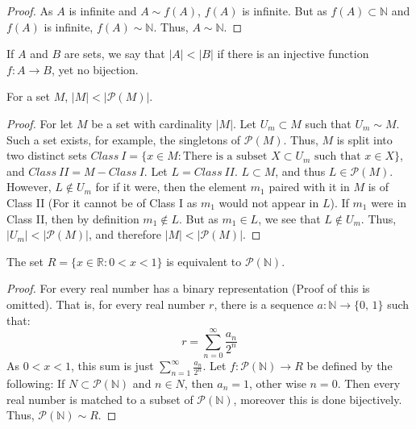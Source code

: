     \begin{proof}
    As $A$ is infinite and $A\sim f(A)$, $f(A)$ is infinite.
    But as $f(A)\subset \mathbb{N}$ and $f(A)$ is infinite,
    $f(A)\sim \mathbb{N}$. Thus, $A\sim \mathbb{N}$.
    \end{proof}
    \begin{definition}
        If $A$ and $B$ are sets, we say that $|A|<|B|$ if there is an
        injective function $f:A\rightarrow B$, yet no bijection.
    \end{definition}
    \begin{theorem}
        For a set $M$, $|M|<|\mathcal{P}(M)|$.
    \end{theorem}
    \begin{proof}
    For let $M$ be a set with cardinality $|M|$. Let $U_m \subset M$ such that $U_m \sim M$.
    Such a set exists, for example, the singletons of $\mathcal{P}(M)$. Thus, $M$ is split into
    two distinct sets $Class\ I=\{x\in M: \textrm{There is a subset } X\subset U_m\textrm{ such that }x\in X\}$,
    and $Class\ II=M-Class\ I$. Let $L = Class\ II$. $L\subset M$, and thus $L\in \mathcal{P}(M)$. However,
    $L \notin U_m$ for if it were, then the element $m_1$ paired with it in $M$ is of Class II
    (For it cannot be of Class I as $m_1$ would not appear in $L$). If $m_1$ were in Class II,
    then by definition $m_1 \notin L$. But as $m_1 \in L$, we see that $L\notin U_m$. Thus,
    $|U_m| <|\mathcal{P}(M)|$, and therefore $|M|<|\mathcal{P}(M)|$.
    \end{proof}
    \begin{theorem}
        The set $R=\{x\in \mathbb{R}:0<x<1\}$ is equivalent to
        $\mathcal{P}(\mathbb{N})$.
    \end{theorem}
    \begin{proof}
        For every real number has a binary representation (Proof of this
        is omitted). That is, for every real number $r$, there is a sequence
        $a:\mathbb{N}\rightarrow\{0,\,1\}$ such that:
        \begin{equation}
            r=\sum_{n=0}^{\infty}\frac{a_{n}}{2^{n}}
        \end{equation}
    As $0<x<1$, this sum is just $\sum_{n=1}^{\infty} \frac{a_n}{2^n}$.
    Let $f:\mathcal{P}(\mathbb{N})\rightarrow R$ be defined by the
    following: If $N\subset \mathcal{P}(\mathbb{N})$ and $n\in N$, then
    $a_{n}=1$, other wise $n=0$. Then every real number is matched to a
    subset of $\mathcal{P}(\mathbb{N})$, moreover this is done bijectively.
    Thus, $\mathcal{P}(\mathbb{N})\sim R$.
    \end{proof}
